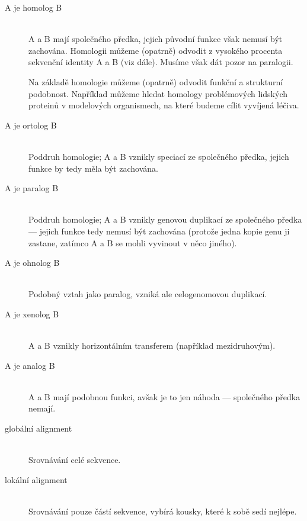 \documentclass[DIV=8]{scrreprt}
\begin{document}
\begin{description}
\item[A je homolog B]\hfill \\
A a B mají společného předka, jejich původní funkce však nemusí být zachována. Homologii můžeme (opatrně) odvodit z vysokého procenta sekvenční identity A a B (viz dále). Musíme však dát pozor na paralogii.

Na základě homologie můžeme (opatrně) odvodit funkční a strukturní podobnost. Například můžeme hledat homology problémových lidských proteinů v modelových organismech, na které budeme cílit vyvíjená léčiva.


\item[A je ortolog B]\hfill \\
Poddruh homologie; A a B vznikly speciací ze společného předka, jejich funkce by tedy měla být zachována.


\item[A je paralog B]\hfill \\
Poddruh homologie; A a B vznikly genovou duplikací ze společného
předka --- jejich funkce tedy nemusí být zachována
(protože jedna kopie genu ji zastane, zatímco A a B se mohli vyvinout v něco jiného).


\item[A je ohnolog B]\hfill \\
Podobný vztah jako paralog, vzniká ale celogenomovou duplikací.


\item[A je xenolog B]\hfill \\
A a B vznikly horizontálním transferem (například mezidruhovým).


\item[A je analog B]\hfill \\
A a B mají podobnou funkci, avšak je to jen náhoda --- společného předka nemají.


\item[globální alignment]\hfill \\
Srovnávání celé sekvence.


\item[lokální alignment]\hfill \\
Srovnávání pouze částí sekvence, vybírá kousky, které k sobě sedí nejlépe.

\end{description}
\end{document}
